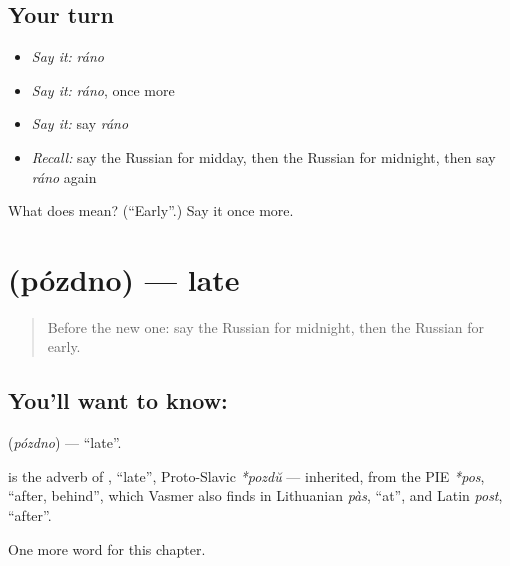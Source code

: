 \subsection*{Your turn}
\begin{itemize}
\raggedright
  \item \emph{Say it:} \emph{ráno}
  \item \emph{Say it:} \emph{ráno}, once more
  \item \emph{Say it:} say \emph{ráno}
  \item \emph{Recall:} say the Russian for midday, then the Russian for midnight, then say \emph{ráno} again
\end{itemize}

\begin{tcolorbox}[breakable,colback=teal!4,colframe=teal!35!black,title={Before you move on}]
What does  mean? (\textquotedblleft{}Early\textquotedblright{}.) Say it once more.
\end{tcolorbox}
\section[\texorpdfstring{\ru{поздно} (pózdno)}{поздно (pózdno)}]{ (pózdno) — late}

\label{lesson:RU-C83-late}



\begin{quote}
Before the new one: say the Russian for midnight, then the Russian for early.
\end{quote}

\subsection*{You'll want to know: }
\textbf{} (\emph{pózdno}) — \textquotedblleft{}late\textquotedblright{}.

\begin{cousinweb}
\textbf{} is the adverb of \emph{}, \textquotedblleft{}late\textquotedblright{}, Proto-Slavic \emph{*pozdŭ} — inherited, from the PIE \emph{*pos}, \textquotedblleft{}after, behind\textquotedblright{}, which Vasmer also finds in Lithuanian \emph{pàs}, \textquotedblleft{}at\textquotedblright{}, and Latin \emph{post}, \textquotedblleft{}after\textquotedblright{}.
\end{cousinweb}

\begin{grammarlens}[title={What you've built}]
One more word for this chapter.
\end{grammarlens}

